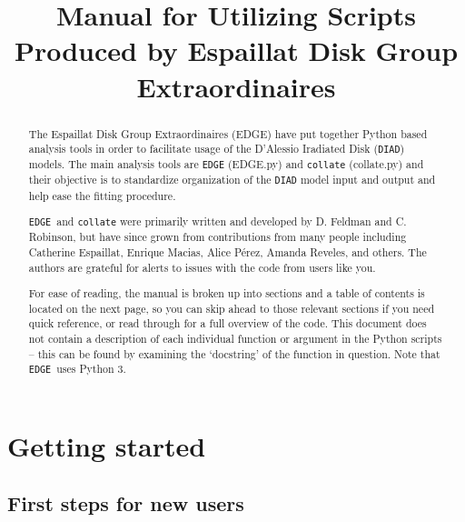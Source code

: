 \documentclass{article}
\title{Manual for Utilizing Scripts Produced by Espaillat Disk Group Extraordinaires}
\newcommand{\edge}{\texttt{EDGE }}
\begin{document}
\begin{titlepage}

\maketitle

\begin{abstract}

The Espaillat Disk Group Extraordinaires (EDGE) have put together Python based analysis tools in order to facilitate usage of the D'Alessio Iradiated Disk (\texttt{DIAD}) models.  The main analysis tools are \texttt{EDGE} (EDGE.py) and \texttt{collate} (collate.py) and their objective is to standardize organization of the \texttt{DIAD} model input and output and help ease the fitting procedure. 

\edge and \texttt{collate} were primarily written and developed by D. Feldman and C. Robinson, but have since grown from contributions from many people including Catherine Espaillat, Enrique Macias, Alice P\'erez, Amanda Reveles, and others. The authors are grateful for alerts to issues with the code from users like you.

For ease of reading, the manual is broken up into sections and a table of contents is located on the next page, so you can skip ahead to those relevant sections if you need quick reference, or read through for a full overview of the code. This document does not contain a description of each individual function or argument in the Python scripts -- this can be found by examining the `docstring' of the function in question.  Note that \edge uses Python 3.

\end{abstract}

\end{titlepage}

\tableofcontents
\newpage

\section{Getting started}

\subsection{First steps for new users}
\end{document}
